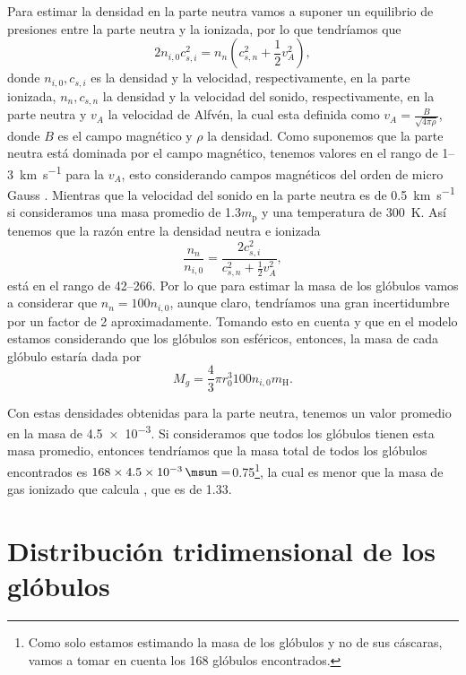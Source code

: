 \documentclass{book}
\begin{document}
Para estimar la densidad en la parte neutra vamos a suponer un equilibrio de presiones entre la parte neutra y la ionizada, por lo que tendríamos que
\begin{equation}
    2 n_{i,0}c_{s,i}^2 = n_n(c_{s,n}^2+\frac{1}{2}v_A^2),
\end{equation}
donde $n_{i,0}, c_{s,i}$ es la densidad y la velocidad, respectivamente, en la parte ionizada, $n_n, c_{s,n}$ la densidad y la velocidad del sonido, respectivamente, en la parte neutra y $v_A$ la velocidad de Alfvén, la cual esta definida como $v_A=\frac{B}{\sqrt{4\pi \rho}}$,  donde $B$ es el campo magnético y $\rho$ la densidad. Como suponemos que la parte neutra está dominada por el campo magnético, tenemos valores en el rango de 1--\SI{3}{km.s^{-1}} para la $v_A$, esto considerando campos magnéticos del orden de micro Gauss \citep{Bertoldi_1989}. Mientras que la velocidad del sonido en la parte neutra es de \SI{0.5}{km.s^{-1}} si consideramos una masa promedio de 1.3$m_\mathrm{p}$ y una temperatura de \SI{300}{K}. Así tenemos que la razón entre la densidad neutra e ionizada 
\begin{equation}
    \frac{n_n}{n_{i,0}}=\frac{2c_{s,i}^2}{c_{s,n}^2+\frac{1}{2}v_A^2},
\end{equation}
está en el rango de 42--266. Por lo que para estimar la masa de los glóbulos vamos a considerar que $n_n=100n_{i,0}$, aunque claro, tendríamos una gran incertidumbre por un factor de 2 aproximadamente. Tomando esto en cuenta y que en el modelo estamos considerando que los glóbulos son esféricos, entonces, la masa de cada glóbulo estaría dada por
\begin{equation}
    M_g = \frac{4}{3}\pi r_0^3 100n_{i,0} m_\mathrm{H}.
\end{equation}

Con estas densidades obtenidas para la parte neutra, tenemos un valor promedio en la masa de \SI{4.5e-3}{\msun}.
Si consideramos que todos los glóbulos tienen esta masa promedio, entonces tendríamos que la masa total de todos los glóbulos encontrados es $168\times\SI{4.5e-3}{\msun}=$\SI{0.75}{\msun}\footnote{Como solo estamos estimando la masa de los glóbulos y no de sus cáscaras, vamos a tomar en cuenta los 168 glóbulos encontrados. }, la cual es menor que la masa de gas ionizado que calcula \cite{Grosdidier:1998}, que es de \SI{1.33}{\msun}.


\section{Distribución tridimensional de los glóbulos} \label{sec: distrtibucion}
\end{document}
